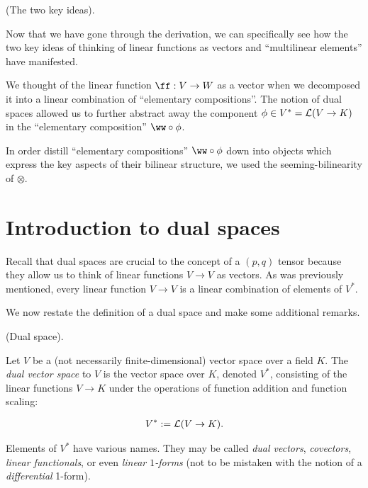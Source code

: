 \begin{remark}
    (The two key ideas). 
    
    Now that we have gone through the derivation, we can specifically see how the two key ideas of thinking of linear functions as vectors and ``multilinear elements'' have manifested.
    
    We thought of the linear function $\ff:V \rightarrow W$ as a vector when we decomposed it into a linear combination of ``elementary compositions''. The notion of dual spaces allowed us to further abstract away the component $\phi \in V^* = \mathcal{L}(V \rightarrow K)$ in the ``elementary composition'' $\ww \circ \phi$.
    
    In order distill ``elementary compositions'' $\ww \circ \phi$ down into objects which express the key aspects of their bilinear structure, we used the seeming-bilinearity of $\otimes$.
\end{remark}

\newpage

\section{Introduction to dual spaces}

Recall that dual spaces are crucial to the concept of a $(p, q)$ tensor because they allow us to think of linear functions $V \rightarrow V$ as vectors. As was previously mentioned, every linear function $V \rightarrow V$ is a linear combination of elements of $V^*$.

We now restate the definition of a dual space and make some additional remarks.

\begin{defn}
\label{ch::motivated_intro::defn::dual_space_2}
    (Dual space). 
    
    Let $V$ be a (not necessarily finite-dimensional) vector space over a field $K$. The \textit{dual vector space} to $V$ is the vector space over $K$, denoted $V^*$, consisting of the linear functions $V \rightarrow K$ under the operations of function addition and function scaling:
    
    \begin{align*}
        V^* := \mathcal{L}(V \rightarrow K).
    \end{align*}
    
    Elements of $V^*$ have various names. They may be called \textit{dual vectors}, \textit{covectors}, \textit{linear functionals}, or even \textit{linear $1$-forms} (not to be mistaken with the notion of a \textit{differential} 1-form).
\end{defn}

